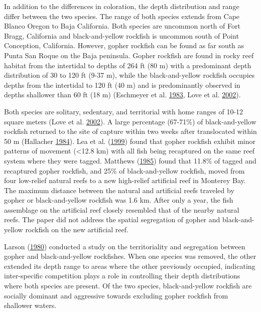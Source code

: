 \documentclass[12pt,]{article}
\begin{document}
In addition to the differences in coloration, the depth distribution and
range differ between the two species. The range of both species extends
from Cape Blanco Oregon to Baja California. Both species are uncommon
north of Fort Bragg, California and black-and-yellow rockfish is
uncommon south of Point Conception, California. However, gopher rockfish
can be found as far south as Punta San Roque on the Baja peninsula.
Gopher rockfish are found in rocky reef habitat from the intertidal to
depths of 264 ft (80 m) with a predominant depth distribution of 30 to
120 ft (9-37 m), while the black-and-yellow rockfish occupies depths
from the intertidal to 120 ft (40 m) and is predominantly observed in
depths shallower than 60 ft (18 m) (Eschmeyer et al.
\protect\hyperlink{ref-Eschmeyer1983}{1983}, Love et al.
\protect\hyperlink{ref-Love2002}{2002}).

Both species are solitary, sedentary, and territorial with home ranges
of 10-12 square meters (Love et al.
\protect\hyperlink{ref-Love2002}{2002}). A large percentage (67-71\%) of
black-and-yellow rockfish returned to the site of capture within two
weeks after translocated within 50 m (Hallacher
\protect\hyperlink{ref-Hallacher1984}{1984}). Lea et al.
(\protect\hyperlink{ref-Lea1999}{1999}) found that gopher rockfish
exhibit minor patterns of movement (\textless{}12.8 km) with all fish
being recaptured on the same reef system where they were tagged.
Matthews (\protect\hyperlink{ref-Matthews1985}{1985}) found that 11.8\%
of tagged and recaptured gopher rockfish, and 25\% of black-and-yellow
rockfish, moved from four low-relief natural reefs to a new high-relief
artificial reef in Monterey Bay. The maximum distance between the
natural and artificial reefs traveled by gopher or black-and-yellow
rockfish was 1.6 km. After only a year, the fish assemblage on the
artificial reef closely resembled that of the nearby natural reefs. The
paper did not address the spatial segregation of gopher and
black-and-yellow rockfish on the new artificial reef.

Larson (\protect\hyperlink{ref-Larson1980}{1980}) conducted a study on
the territoriality and segregation between gopher and black-and-yellow
rockfishes. When one species was removed, the other extended its depth
range to areas where the other previously occupied, indicating
inter-specific competition plays a role in controlling their depth
distributions where both species are present. Of the two species,
black-and-yellow rockfish are socially dominant and aggressive towards
excluding gopher rockfish from shallower waters.
\end{document}
